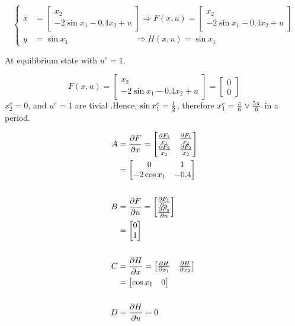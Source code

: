\documentclass[12pt,a4paper]{article}
\begin{document}
\[\begin{cases}
	\dot x &= \begin{bmatrix}
		x_2 \\ -2\sin x_1- 0.4 x_2 +u
	\end{bmatrix}  \Rightarrow F(x, u) = \begin{bmatrix}
	x_2 \\ -2\sin x_1 - 0.4 x_2 + u
	\end{bmatrix} \\
	y &= \sin x_1  \qquad \qquad\qquad \qquad \Rightarrow H(x, u) = \sin x_1
\end{cases}
\]

At equilibrium state with $u^e = 1$.

\[
F(x, u) = \begin{bmatrix}
	x_2 \\ -2\sin x_1 - 0.4 x_2 + u
\end{bmatrix} = \begin{bmatrix}
0 \\ 0
\end{bmatrix}
\]
$x_2^e = 0$, and $u^e = 1$ are tivial .Hence, $ \sin x_1^e = {1\over2}$,
therefore $x_1^e = {\pi\over6} \lor {5\pi\over6} $ in a period.


\begin{align*}
	A &= {\partial F \over \partial x} = \begin{bmatrix}
		{\partial F_1 \over x_1} & {\partial F_1 \over x_2} \\
		{\partial F_2 \over x_1} & {\partial F_2 \over x_2}
	\end{bmatrix} \\
	&= \begin{bmatrix}
		0 & 1 \\
		-2\cos x_1 & -0.4
	\end{bmatrix}\\ \\
	B &= {\partial F \over \partial u} = \begin{bmatrix}
		{\partial F_1 \over \partial u} \\
		{\partial F_2 \over \partial u}
	\end{bmatrix}\\
	&= \begin{bmatrix}
		0 \\ 1
	\end{bmatrix} \\ \\
	C &= {\partial H \over \partial x} = \begin{bmatrix}
		{\partial H \over \partial x_1} & {\partial H \over \partial x_2}
	\end{bmatrix}\\
	&= \begin{bmatrix}
		\cos x_1 & 0
	\end{bmatrix} \\ \\
	 D &= {\partial H \over \partial u} = 0
\end{align*}
\end{document}
